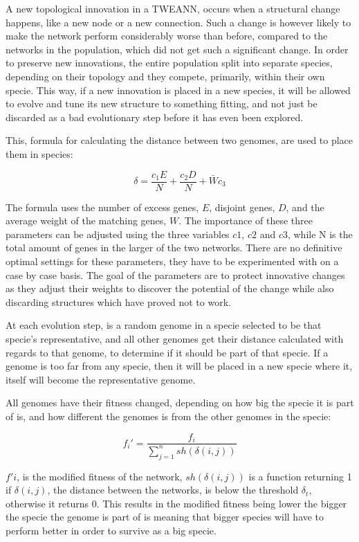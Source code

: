 A new topological innovation in a TWEANN, occurs when a structural change happens, like a new node or a new connection. Such a change is however likely to make the network perform considerably worse than before, compared to the networks in the population, which did not get such a significant change. In order to preserve new innovations, the entire population split into separate species, depending on their topology and they compete, primarily, within their own specie. This way, if a new innovation is placed in a new species, it will be allowed to evolve and tune its new structure to something fitting, and not just be discarded as a bad evolutionary step before it has even been explored.

This, formula for calculating the distance between two genomes, are used to place them in species: 

$$\delta = \frac{c_1E}{N} + \frac{c_2D}{N} + \bar W c_3$$

The formula uses the number of excess genes, $E$, disjoint genes, $D$, and the average weight of the matching genes, $W$. The importance of these three parameters can be adjusted using the three variables $c1$, $c2$ and $c3$, while N is the total amount of genes in the larger of the two networks. There are no definitive optimal settings for these parameters, they have to be experimented with on a case by case basis. The goal of the parameters are to protect innovative changes as they adjust their weights to discover the potential of the change while also discarding structures which have proved not to work. 

At each evolution step, is a random genome in a specie selected to be that specie's representative, and all other genomes get their distance calculated with regards to that genome, to determine if it should be part of that specie. If a genome is too far from any specie, then it will be placed in a new specie where it, itself will become the representative genome.

All genomes have their fitness changed, depending on how big the specie it is part of is, and how different the genomes is from the other genomes in the specie:

$$f_i' = \frac{f_i}{\sum^n_{j=1} sh(\delta(i,j))}$$

$f'i$, is the modified fitness of the network, $sh(\delta(i,j))$ is a function returning 1 if $\delta(i,j)$, the distance between the networks, is below the threshold $\delta_t$, otherwise it returns 0. This results in the modified fitness being lower the bigger the specie the genome is part of is meaning that bigger species will have to perform better in order to survive as a big specie.

